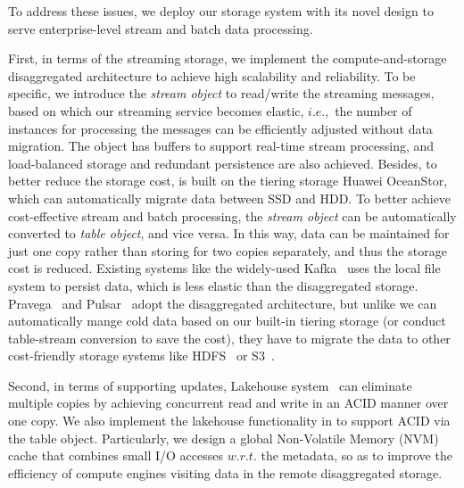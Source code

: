


To address these issues, we deploy our \sys storage system with its novel design to serve enterprise-level  stream and batch data processing.


First, in terms of the streaming storage, we implement the compute-and-storage disaggregated architecture to achieve high scalability and reliability. To be specific, 
 we introduce the \textit{stream object}  to read/write the streaming messages, based on which our streaming service becomes elastic, $i.e.,$ the number of instances for processing the messages can be efficiently adjusted without data migration. The object has buffers to support real-time stream processing, and load-balanced storage and redundant persistence are also achieved. 
Besides, to better reduce the storage cost,  \sys is built on the tiering storage Huawei OceanStor, which can automatically migrate data between SSD and HDD.
To better achieve cost-effective stream and batch processing, the \textit{stream object}  can be automatically converted  to  \textit{table object}, and vice versa. In this way, data can be maintained for just one copy rather than storing for two copies separately, and thus the storage cost is reduced. 
Existing systems like the widely-used Kafka~\cite{} uses the local file system to persist data, which is less elastic than the disaggregated storage.  Pravega~\cite{} and Pulsar~\cite{} adopt the disaggregated architecture, but unlike we can automatically mange cold data based on our built-in tiering storage (or conduct table-stream conversion to save the cost), they have to migrate the data to other cost-friendly storage systems like  HDFS~\cite{} or S3~\cite{}.




Second, in terms of supporting updates, Lakehouse system~\cite{} can eliminate multiple copies by achieving concurrent read and write in an ACID manner over one copy. We also implement the lakehouse functionality in \sys to support ACID via the table object.
Particularly, we design a global Non-Volatile Memory (NVM) cache that combines small I/O accesses $w.r.t.$ the metadata, so as to improve the efficiency of  compute engines visiting data in the remote disaggregated storage.

